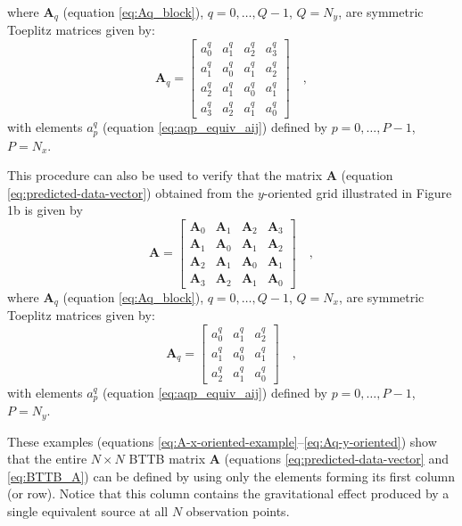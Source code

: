 where $\mathbf{A}_{q}$ (equation \ref{eq:Aq_block}), $q = 0, \dots, Q -1$, $Q = N_{y}$, 
are symmetric Toeplitz matrices given by:
\begin{equation}
\mathbf{A}_{q} = \begin{bmatrix}
a^{q}_{0} & a^{q}_{1} & a^{q}_{2} & a^{q}_{3} \\
a^{q}_{1} & a^{q}_{0} & a^{q}_{1} & a^{q}_{2} \\
a^{q}_{2} & a^{q}_{1} & a^{q}_{0} & a^{q}_{1} \\
a^{q}_{3} & a^{q}_{2} & a^{q}_{1} & a^{q}_{0}
\end{bmatrix} \quad ,
\label{eq:Aq-x-oriented}
\end{equation}
with elements $a^{q}_{p}$ (equation \ref{eq:aqp_equiv_aij}) defined by 
$p = 0, \dots, P - 1$, $P = N_{x}$.

This procedure can also be used to verify that the matrix $\mathbf{A}$ 
(equation \ref{eq:predicted-data-vector}) obtained
from the $y$-oriented grid illustrated in Figure 1b is given by
\begin{equation}
\mathbf{A} = \begin{bmatrix}
\mathbf{A}_{0} & \mathbf{A}_{1} & \mathbf{A}_{2} & \mathbf{A}_{3} \\
\mathbf{A}_{1} & \mathbf{A}_{0} & \mathbf{A}_{1} & \mathbf{A}_{2} \\
\mathbf{A}_{2} & \mathbf{A}_{1} & \mathbf{A}_{0} & \mathbf{A}_{1} \\
\mathbf{A}_{3} & \mathbf{A}_{2} & \mathbf{A}_{1} & \mathbf{A}_{0}
\end{bmatrix} \quad ,
\label{eq:A-y-oriented-example}
\end{equation}
where $\mathbf{A}_{q}$ (equation \ref{eq:Aq_block}), $q = 0, \dots, Q - 1$, $Q = N_{x}$, 
are symmetric Toeplitz matrices given by:
\begin{equation}
\mathbf{A}_{q} = \begin{bmatrix}
a^{q}_{0} & a^{q}_{1} & a^{q}_{2} \\
a^{q}_{1} & a^{q}_{0} & a^{q}_{1} \\
a^{q}_{2} & a^{q}_{1} & a^{q}_{0}
\end{bmatrix} \quad ,
\label{eq:Aq-y-oriented}
\end{equation}
with elements $a^{q}_{p}$ (equation \ref{eq:aqp_equiv_aij}) defined by 
$p = 0, \dots, P - 1$, $P = N_{y}$.

These examples (equations \ref{eq:A-x-oriented-example}--\ref{eq:Aq-y-oriented}) show 
that the entire $N \times N$ BTTB matrix $\mathbf{A}$ 
(equations \ref{eq:predicted-data-vector} and \ref{eq:BTTB_A}) 
can be defined by using only the elements 
forming its first column (or row). Notice that this column contains the gravitational effect 
produced by a single equivalent source at all $N$ observation points.

